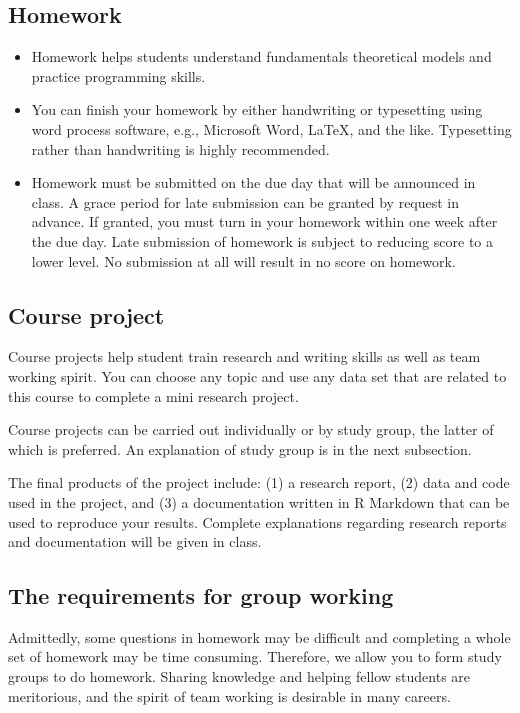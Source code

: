 \documentclass[a4paper,11pt]{article}
\begin{document}
\subsection*{Homework}
\label{sec:org59c2930}

\begin{itemize}
\item Homework helps students understand fundamentals
theoretical models and practice programming skills.

\item You can finish your homework by either handwriting or typesetting
using word process software, e.g., Microsoft Word, \LaTeX{}, and the
like. Typesetting rather than handwriting is highly recommended.

\item Homework must be submitted on the due day that will be announced in
class. A grace period for late submission can be granted by request
in advance. If granted, you must turn in your homework within one
week after the due day. Late submission of homework is subject to
reducing score to a lower level. No submission at all will result in
no score on homework.
\end{itemize}


\subsection*{Course project}
\label{sec:orgab727e2}

Course projects help student train research and writing skills as well
as team working spirit. You can choose any topic and use any data set
that are related to this course to complete a mini research
project.

Course projects can be carried out individually or by study group, the
latter of which is preferred. An explanation of study group is in the
next subsection.

The final products of the project include: (1) a research report, (2)
data and code used in the project, and (3) a documentation written in
R Markdown that can be used to reproduce your results. Complete
explanations regarding research reports and documentation will be
given in class.


\subsection*{The requirements for group working}
\label{sec:orgacf2053}

Admittedly, some questions in homework may be difficult and completing
a whole set of homework may be time consuming. Therefore, we allow you
to form study groups to do homework. Sharing knowledge and helping
fellow students are meritorious, and the spirit of team working is
desirable in many careers.
\end{document}
